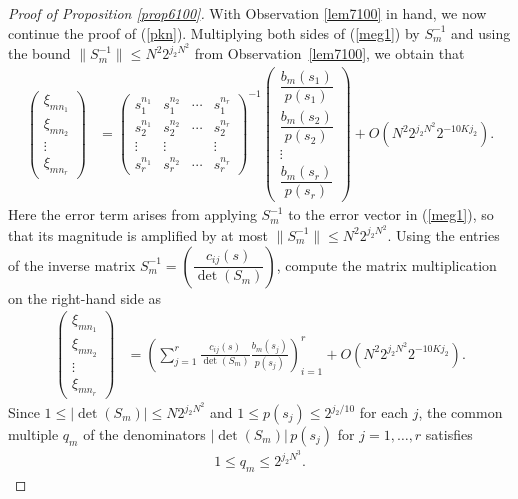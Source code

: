 \documentclass[10pt,a4paper]{amsart}
\numberwithin{equation}{section}
\begin{document}
\begin{proof}[Proof of Proposition \ref{prop6100}]
With Observation \ref{lem7100} in hand,
we now continue the proof of (\ref{pkn}).
Multiplying both sides of (\ref{meg1}) by $S_m^{-1}$ and using the bound 
$\|S_m^{-1}\| \le N^2 2^{j_2 N^2}$ from Observation~\ref{lem7100}, we obtain  that
\begin{align*} 
\begin{pmatrix}
\xi_{mn_1}\\
\xi_{mn_2}\\
\vdots\\
\xi_{mn_r}
\end{pmatrix}
&=
\begin{pmatrix}
s_1^{n_1} & s_1^{n_2} & \cdots & s_1^{n_r} \\
s_2^{n_1} & s_2^{n_2} & \cdots & s_2^{n_r} \\
\vdots & \vdots & & \vdots \\
s_r^{n_1} & s_r^{n_2} & \cdots & s_r^{n_r}
\end{pmatrix}^{-1}
\begin{pmatrix}
\dfrac{b_m(s_1)}{p(s_1)}\\[4pt]
\dfrac{b_m(s_2)}{p(s_2)}\\[4pt]
\vdots\\
\dfrac{b_m(s_r)}{p(s_r)}
\end{pmatrix}
+ O\!\left(N^2 2^{j_2 N^2} 2^{-10Kj_2}\right).
\end{align*}
Here the error term arises from applying $S_m^{-1}$ to the error vector in (\ref{meg1}), 
so that its magnitude is amplified by at most $\|S_m^{-1}\| \le N^2 2^{j_2 N^2}$.
  Using the entries of the inverse matrix 
$S_m^{-1}=\left(\dfrac{c_{ij}(s)}{\det(S_m)}\right)$, 
  compute the matrix multiplication on the right-hand side as
\begin{align*}
\begin{pmatrix}
\xi_{mn_1}\\
\xi_{mn_2}\\
\vdots\\
\xi_{mn_r}
\end{pmatrix}
&=
\left(
  \sum_{j=1}^r 
  \frac{c_{ij}(s)}{\det(S_m)} 
  \frac{b_m(s_j)}{p(s_j)}
\right)_{i=1}^r
+ O\!\left(N^2 2^{j_2 N^2} 2^{-10Kj_2}\right).
\end{align*}
Since  
$1\le |\det(S_m)| \le N 2^{j_2 N^2}$ 
and 
$1 \le p(s_j) \le 2^{j_2/10}$ 
for each $j$, 
the common multiple $q_m$ of the denominators 
$|\det(S_m)|\,p(s_j)$ for $j=1,\dots,r$ 
satisfies
\begin{align}\label{gh11}
1\le 
q_m \le 2^{j_2 N^3}.
\end{align}

\end{proof}
\end{document}
